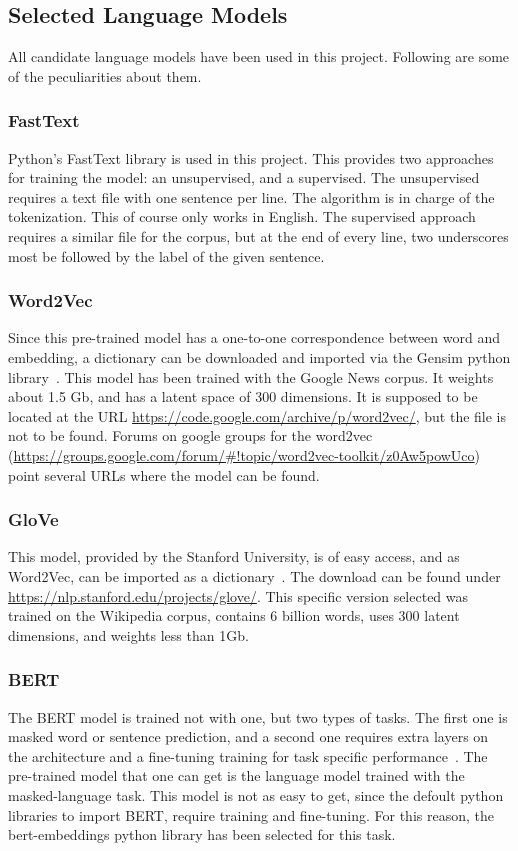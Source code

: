 \subsection{Selected Language Models}\label{sub:Selected Language Models}
All candidate language models have been used in this project. Following are some of the peculiarities about them.

\subsubsection{FastText}\label{subs:FastText}
Python's FastText library\cite{joulin2017fasttext} is used in this project. This provides two approaches for training the model: an unsupervised, and a supervised. The unsupervised requires a text file with one sentence per line. The algorithm is in charge of the tokenization. This of course only works in English. The supervised approach requires a similar file for the corpus, but at the end of every line, two underscores most be followed by the label of the given sentence.

\subsubsection{Word2Vec}\label{subs:Word2Vec}
Since this pre-trained model has a one-to-one correspondence between word and embedding, a dictionary can be downloaded and imported via the Gensim python library~\cite{mikolov2013word2vec}. This model has been trained with the Google News corpus. It weights about 1.5 Gb, and has a latent space of 300 dimensions. It is supposed to be located at the URL \url{https://code.google.com/archive/p/word2vec/}, but the file is not to be found. Forums on google groups for the word2vec (\url{https://groups.google.com/forum/#!topic/word2vec-toolkit/z0Aw5powUco}) point several URLs where the model can be found.

\subsubsection{GloVe}\label{subs:GloVe}
This model, provided by the Stanford University, is of easy access, and as Word2Vec, can be imported as a dictionary~\cite{penningto2014glove}. The download can be found under \url{https://nlp.stanford.edu/projects/glove/}. This specific version selected was trained on the Wikipedia corpus, contains 6 billion words, uses 300 latent dimensions, and weights less than 1Gb.

\subsubsection{BERT}\label{subs:BERT}
The BERT model is trained not with one, but two types of tasks. The first one is masked word or sentence prediction, and a second one requires extra layers on the architecture and a fine-tuning training for task specific performance~\cite{devlin2019bert}. The pre-trained model that one can get is the language model trained with the masked-language task. This model is not as easy to get, since the defoult python libraries to import BERT, require training and fine-tuning. For this reason, the bert-embeddings python library has been selected for this task.

